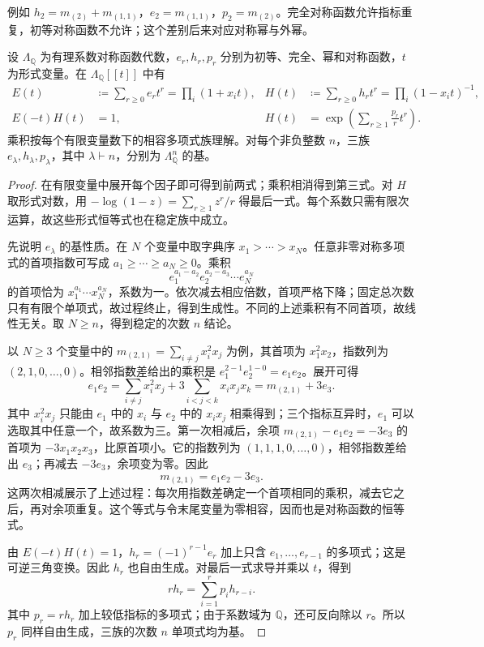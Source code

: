例如 \(h_2=m_{(2)}+m_{(1,1)}\)，\(e_2=m_{(1,1)}\)，\(p_2=m_{(2)}\)。完全对称函数允许指标重复，初等对称函数不允许；这个差别后来对应对称幂与外幂。

\begin{proposition}\label{b5:prop:symmetric-generators}
	设 \(\Lambda_{\mathbb Q}\) 为有理系数对称函数代数，\(e_r,h_r,p_r\) 分别为初等、完全、幂和对称函数，\(t\) 为形式变量。在 \(\Lambda_{\mathbb Q}[\![t]\!]\) 中有
	\begin{align}
		E(t)&\coloneqq\sum_{r\ge0}e_rt^r=\prod_i(1+x_it),& H(t)&\coloneqq\sum_{r\ge0}h_rt^r=\prod_i(1-x_it)^{-1},
		\label{b5:eq:eh-generating}\\
		E(-t)H(t)&=1,& H(t)&=\exp\left(\sum_{r\ge1}\frac{p_r}{r}t^r\right).
		\label{b5:eq:hp-generating}
	\end{align}
	乘积按每个有限变量数下的相容多项式族理解。对每个非负整数 \(n\)，三族 \(e_\lambda,h_\lambda,p_\lambda\)，其中 \(\lambda\vdash n\)，分别为 \(\Lambda_{\mathbb Q}^n\) 的基。
\end{proposition}
\begin{proof}
	在有限变量中展开每个因子即可得到前两式；乘积相消得到第三式。对 \(H\) 取形式对数，用 \(-\log(1-z)=\sum_{r\ge1}z^r/r\) 得最后一式。每个系数只需有限次运算，故这些形式恒等式也在稳定族中成立。

	先说明 \(e_\lambda\) 的基性质。在 \(N\) 个变量中取字典序 \(x_1>\cdots>x_N\)。任意非零对称多项式的首项指数可写成 \(a_1\ge\cdots\ge a_N\ge0\)。乘积
	\[
		e_1^{a_1-a_2}e_2^{a_2-a_3}\cdots e_N^{a_N}
	\]
	的首项恰为 \(x_1^{a_1}\cdots x_N^{a_N}\)，系数为一。依次减去相应倍数，首项严格下降；固定总次数只有有限个单项式，故过程终止，得到生成性。不同的上述乘积有不同首项，故线性无关。取 \(N\ge n\)，得到稳定的次数 \(n\) 结论。

	以 \(N\ge3\) 个变量中的 \(m_{(2,1)}=\sum_{i\ne j}x_i^2x_j\) 为例，其首项为 \(x_1^2x_2\)，指数列为 \((2,1,0,\ldots,0)\)。相邻指数差给出的乘积是 \(e_1^{2-1}e_2^{1-0}=e_1e_2\)。展开可得
	\[
		e_1e_2 =\sum_{i\ne j}x_i^2x_j+3\sum_{i<j<k}x_ix_jx_k =m_{(2,1)}+3e_3.
	\]
	其中 \(x_i^2x_j\) 只能由 \(e_1\) 中的 \(x_i\) 与 \(e_2\) 中的 \(x_ix_j\) 相乘得到；三个指标互异时，\(e_1\) 可以选取其中任意一个，故系数为三。第一次相减后，余项 \(m_{(2,1)}-e_1e_2=-3e_3\) 的首项为 \(-3x_1x_2x_3\)，比原首项小。它的指数列为 \((1,1,1,0,\ldots,0)\)，相邻指数差给出 \(e_3\)；再减去 \(-3e_3\)，余项变为零。因此
	\[
		m_{(2,1)}=e_1e_2-3e_3.
	\]
	这两次相减展示了上述过程：每次用指数差确定一个首项相同的乘积，减去它之后，再对余项重复。这个等式与令末尾变量为零相容，因而也是对称函数的恒等式。

	由 \(E(-t)H(t)=1\)，\(h_r=(-1)^{r-1}e_r\) 加上只含 \(e_1,\ldots,e_{r-1}\) 的多项式；这是可逆三角变换。因此 \(h_r\) 也自由生成。对最后一式求导并乘以 \(t\)，得到
	\begin{equation}\label{b5:eq:newton-h}
		r h_r=\sum_{i=1}^r p_i h_{r-i}.
	\end{equation}
	其中 \(p_r=rh_r\) 加上较低指标的多项式；由于系数域为 \(\mathbb Q\)，还可反向除以 \(r\)。所以 \(p_r\) 同样自由生成，三族的次数 \(n\) 单项式均为基。
\end{proof}

